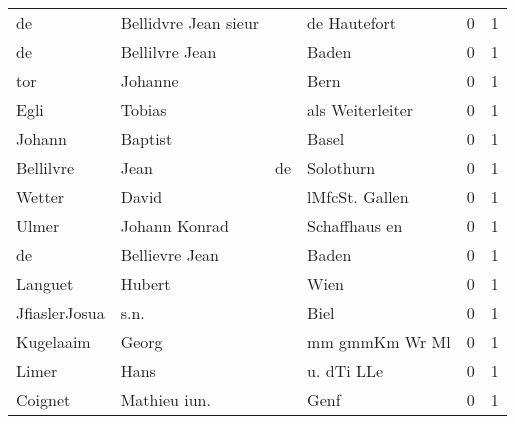 \begin{center}
\begin{tiny}
\begin{longtabu}{llllrr}
                       de &               Bellidvre Jean sieur &             &                                de Hautefort &          0 &         1 \\
                       de &                     Bellilvre Jean &             &                                       Baden &          0 &         1 \\
                      tor &                            Johanne &             &                                        Bern &          0 &         1 \\
                     Egli &                             Tobias &             &                            als Weiterleiter &          0 &         1 \\
                   Johann &                            Baptist &             &                                       Basel &          0 &         1 \\
                Bellilvre &                               Jean &          de &                                   Solothurn &          0 &         1 \\
                   Wetter &                              David &             &                              lMfcSt. Gallen &          0 &         1 \\
                    Ulmer &                      Johann Konrad &             &                               Schaffhaus en &          0 &         1 \\
                       de &                     Bellievre Jean &             &                                       Baden &          0 &         1 \\
                  Languet &                             Hubert &             &                                        Wien &          0 &         1 \\
            JfiaslerJosua &                               s.n. &             &                                        Biel &          0 &         1 \\
                Kugelaaim &                              Georg &             &                              mm gmmKm Wr Ml &          0 &         1 \\
                    Limer &                               Hans &             &                                  u. dTi LLe &          0 &         1 \\
                  Coignet &                       Mathieu iun. &             &                                        Genf &          0 &         1 \\

\end{longtabu}
\end{tiny}
\end{center}
